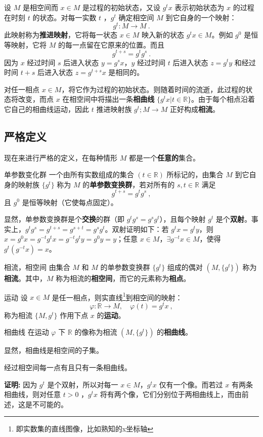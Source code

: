 设 $M$ 是相空间而 $x\in M$ 是过程的初始状态，又设 $g^t x$ 表示初始状态为 $x$ 的过程在时刻 $t$ 的状态。对每一实数 $t$ ，$g^t$ 确定相空间 $M$ 到它自身的一个映射：
\begin{equation}
g^t:M\rightarrow M~.
\end{equation}
此映射称为\textbf{推进映射}，它将每一状态 $x\in M$ 映入新的状态 $g^t x\in M$。例如 $g^0$ 是恒等映射，它将 $M$ 的每一点留在它原来的位置。而且
\begin{equation}
g^{t+s}=g^tg^s~.
\end{equation}
因为 $x$ 经过时间 $s$ 后进入状态 $y=g^s x$，$y$ 经过时间 $t$ 后进入状态 $z=g^t y$ 和经过时间 $t+s$ 后进入状态 $z=g^{t+s} x$ 是相同的。

对任一相点 $x\in M$，将它作为过程的初始状态。则随着时间的流逝，此过程的状态将改变，而点 $x$ 在相空间中将描出一条\textbf{相曲线} $\{g^tx|t\in \mathbb R\}$。由于每个相点沿着它自己的相曲线运动，因此 $t$ 推进映射族 $g^t;M\rightarrow M$ 正好构成\textbf{相流}。 
\subsection{严格定义}
现在来进行严格的定义，在每种情形 $M$ 都是一个\textbf{任意的}集合。
\begin{definition}{单参数变化群}\label{def_PSaPF_1}
一个由所有实数组成的集合 $(t\in \mathbb R)$ 所标记的，由集合 $M$ 到它自身的映射族 $\{g^t\}$ 称为 $M$ 的\textbf{单参数变换群}，若对所有的 $s,t\in\mathbb R$ 满足
\begin{equation}
g^{t+s}=g^tg^s~,
\end{equation}
 且 $g^0$ 是恒等映射（它使每点固定）。
\end{definition}
显然，单参数变换群是个\textbf{交换}的群（即 $g^tg^s=g^sg^t$），且每个映射 $g^t$ 是个\textbf{双射}。事实上，$g^tg^s=g^{t+s}=g^{s+t}=g^sg^t$。双射证明如下：若 $g^t x=g^t y$，则 $x=g^0x=g^{-t}g^tx=g^{-t}g^ty=g^0y=y$；任意 $x\in M$，$\exists g^{-t}x\in M$，使得 $g^t(g^{-t}x)=x$。
\begin{definition}{相流，相空间}
由集合 $M$ 和 $M$ 的单参数变换群 $\{g^t\}$ 组成的偶对 $(M,\{g^t\})$ 称为\textbf{相流}。其中，$M$ 称为相流的\textbf{相空间}，而它的元素称为\textbf{相点}。
\end{definition}
\begin{definition}{运动}
设 $x\in M$ 是任一相点，则实直线\footnote{即实数集的直线图像，比如熟知的x坐标轴}到相空间的映射：
\begin{equation}\label{eq_PSaPF_1}
\varphi:\mathbb R\rightarrow M,\quad \varphi(t)=g^tx~,
\end{equation}
称为相流 $\{M,{g^t}\}$ 作用下点 $x$ 的\textbf{运动}。
\end{definition}
\begin{definition}{相曲线}
在运动 $\varphi$ 下 $\mathbb R$ 的像称为相流 $(M,\{g^t\})$ 的\textbf{相曲线}。
\end{definition}
显然，相曲线是相空间的子集。
\begin{theorem}{}\label{the_PSaPF_1}
经过相空间每一点有且只有一条相曲线。
\end{theorem}
\textbf{证明:}
因为 $g^t$ 是个双射，所以对每一 $x\in M$，$g^t x$ 仅有一个像。而若过 $x$ 有两条相曲线，则对任意 $t>0$ ，$g^tx$ 将有两个像，它们分别位于两相曲线上，而由前述，这是不可能的。

